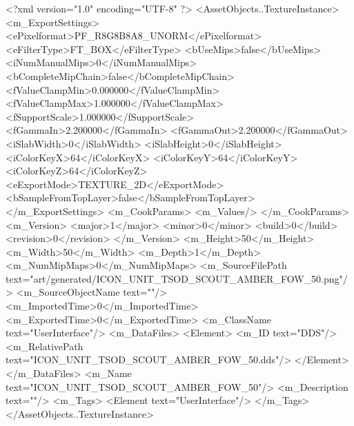 <?xml version="1.0" encoding="UTF-8" ?>
<AssetObjects..TextureInstance>
	<m_ExportSettings>
		<ePixelformat>PF_R8G8B8A8_UNORM</ePixelformat>
		<eFilterType>FT_BOX</eFilterType>
		<bUseMips>false</bUseMips>
		<iNumManualMips>0</iNumManualMips>
		<bCompleteMipChain>false</bCompleteMipChain>
		<fValueClampMin>0.000000</fValueClampMin>
		<fValueClampMax>1.000000</fValueClampMax>
		<fSupportScale>1.000000</fSupportScale>
		<fGammaIn>2.200000</fGammaIn>
		<fGammaOut>2.200000</fGammaOut>
		<iSlabWidth>0</iSlabWidth>
		<iSlabHeight>0</iSlabHeight>
		<iColorKeyX>64</iColorKeyX>
		<iColorKeyY>64</iColorKeyY>
		<iColorKeyZ>64</iColorKeyZ>
		<eExportMode>TEXTURE_2D</eExportMode>
		<bSampleFromTopLayer>false</bSampleFromTopLayer>
	</m_ExportSettings>
	<m_CookParams>
		<m_Values/>
	</m_CookParams>
	<m_Version>
		<major>1</major>
		<minor>0</minor>
		<build>0</build>
		<revision>0</revision>
	</m_Version>
	<m_Height>50</m_Height>
	<m_Width>50</m_Width>
	<m_Depth>1</m_Depth>
	<m_NumMipMaps>0</m_NumMipMaps>
	<m_SourceFilePath text="art/generated/ICON_UNIT_TSOD_SCOUT_AMBER_FOW_50.png"/>
	<m_SourceObjectName text=""/>
	<m_ImportedTime>0</m_ImportedTime>
	<m_ExportedTime>0</m_ExportedTime>
	<m_ClassName text="UserInterface"/>
	<m_DataFiles>
		<Element>
			<m_ID text="DDS"/>
			<m_RelativePath text="ICON_UNIT_TSOD_SCOUT_AMBER_FOW_50.dds"/>
		</Element>
	</m_DataFiles>
	<m_Name text="ICON_UNIT_TSOD_SCOUT_AMBER_FOW_50"/>
	<m_Description text=""/>
	<m_Tags>
		<Element text="UserInterface"/>
	</m_Tags>
</AssetObjects..TextureInstance>

